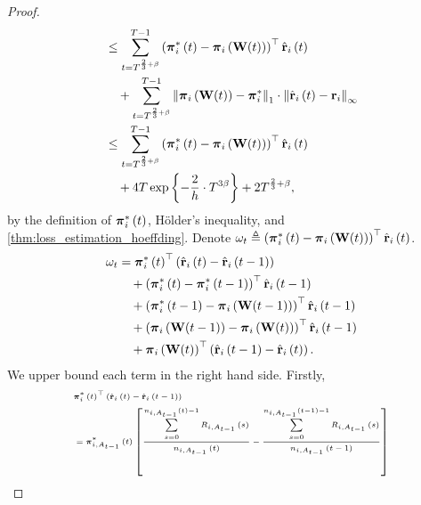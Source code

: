 \begin{proof}
\begin{equation}
\begin{split}
    &\le \sum\limits_{t=T^{\frac{2}{3} + \beta}}^{T-1}{ \left( {{\boldsymbol{\pi}}_i^*\left(t\right)} - {\boldsymbol{\pi}}_i\left( {\mathbf{W}}(t) \right) \right)^\top \hat{{\mathbf{r}}}_i\left(t\right) } \\
    &\quad + \sum\limits_{t=T^{\frac{2}{3} + \beta}}^{T-1}{  \left\| {\boldsymbol{\pi}}_i\left( {\mathbf{W}}(t) \right) - {\boldsymbol{\pi}}_i^* \right\|_1 \cdot \left\| \hat{{\mathbf{r}}}_i\left(t\right) - {\mathbf{r}}_i \right\|_\infty } \\
    &\le \sum\limits_{t=T^{\frac{2}{3} + \beta}}^{T-1}{ \left( {{\boldsymbol{\pi}}_i^*\left(t\right)} - {\boldsymbol{\pi}}_i\left( {\mathbf{W}}(t) \right) \right)^\top \hat{{\mathbf{r}}}_i\left(t\right) } \\
    &\quad + 4 T \exp\left\{ - \frac{2}{h} \cdot  T^{3\beta} \right\} + 2 T^{\frac{2}{3} + \beta},
\end{split}
\end{equation}
by the definition of ${\boldsymbol{\pi}}_i^*\left(t\right)$, H{\"o}lder's inequality, and \cref{thm:loss_estimation_hoeffding}. Denote $\omega_t \triangleq \left( {{\boldsymbol{\pi}}_i^*\left(t\right)} - {\boldsymbol{\pi}}_i\left( {\mathbf{W}}(t) \right) \right)^\top \hat{{\mathbf{r}}}_i\left(t\right)$.
\begin{equation}
\label{eq:dynamic_regret_decomposition}
\begin{split}
    \omega_t &= {{\boldsymbol{\pi}}_i^*\left(t\right)}^\top \left( \hat{{\mathbf{r}}}_i\left(t\right) - \hat{{\mathbf{r}}}_i\left(t-1\right)\right) \\
    &\quad + \left( {{\boldsymbol{\pi}}_i^*\left(t\right)} - {{\boldsymbol{\pi}}_i^*\left(t-1\right)} \right)^\top \hat{{\mathbf{r}}}_i\left(t-1\right) \\
    &\quad + \left( {{\boldsymbol{\pi}}_i^*\left(t-1\right)} - {\boldsymbol{\pi}}_i\left( {\mathbf{W}}(t-1) \right) \right)^\top \hat{{\mathbf{r}}}_i\left(t-1\right) \\
    &\quad + \left(  {\boldsymbol{\pi}}_i\left( {\mathbf{W}}(t-1) \right) - {\boldsymbol{\pi}}_i\left( {\mathbf{W}}(t) \right) 
    \right)^\top \hat{{\mathbf{r}}}_i\left(t-1\right) \\
    &\quad + {\boldsymbol{\pi}}_i\left( {\mathbf{W}}(t) \right)^\top \left( \hat{{\mathbf{r}}}_i\left(t-1\right) - \hat{{\mathbf{r}}}_i\left(t\right)  \right).
\end{split}
\end{equation}
We upper bound each term in the right hand side. Firstly,
\begin{equation*}
\tiny
\begin{split}
    &{\rvpi_i^*\left(t\right)}^\top \left( \hat{\rvr}_i\left(t\right) - \hat{\rvr}_i\left(t-1\right)\right) \\
    &= {\rvpi_{i, A_{t-1}}^*\left(t\right)} \left[ \frac{\sum\limits_{s=0}^{n_{i, A_{t-1}}\left(t\right)-1}{R_{i, A_{t-1}}\left(s\right)}}{n_{i, A_{t-1}}\left(t\right)} - \frac{\sum\limits_{s=0}^{n_{i, A_{t-1}}\left(t-1\right)-1}{R_{i, A_{t-1}}\left(s\right)}}{n_{i, A_{t-1}}\left(t-1\right)} \right] \\

\end{split}
\end{equation*}
\end{proof}
